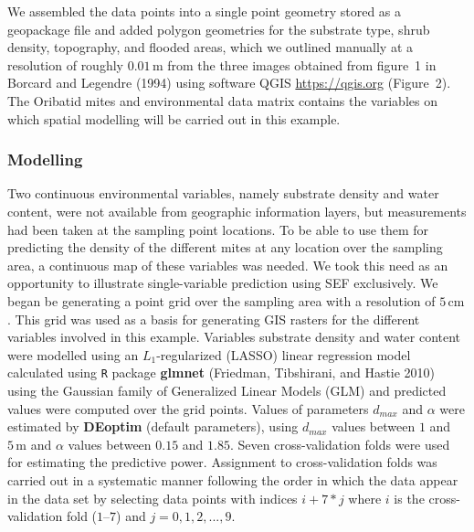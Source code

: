 \documentclass[
]{article}
\begin{document}
We assembled the data points into a single point geometry stored as a
geopackage file and added polygon geometries for the substrate type,
shrub density, topography, and flooded areas, which we outlined manually
at a resolution of roughly \(0.01\,\mathrm{m}\) from the three images
obtained from figure~1 in Borcard and Legendre (1994) using software
QGIS \url{https://qgis.org} (Figure~2). The Oribatid mites and
environmental data matrix contains the variables on which spatial
modelling will be carried out in this example.

\subsubsection{Modelling}\label{modelling}

Two continuous environmental variables, namely substrate density and
water content, were not available from geographic information layers,
but measurements had been taken at the sampling point locations. To be
able to use them for predicting the density of the different mites at
any location over the sampling area, a continuous map of these variables
was needed. We took this need as an opportunity to illustrate
single-variable prediction using SEF exclusively. We began be generating
a point grid over the sampling area with a resolution of
\(5\,\mathrm{cm}\). This grid was used as a basis for generating GIS
rasters for the different variables involved in this example. Variables
substrate density and water content were modelled using an
\(L_1\)-regularized (LASSO) linear regression model calculated using
\texttt{R} package \textbf{glmnet} (Friedman, Tibshirani, and Hastie
2010) using the Gaussian family of Generalized Linear Models (GLM) and
predicted values were computed over the grid points. Values of
parameters \(d_{max}\) and \(\alpha\) were estimated by \textbf{DEoptim}
(default parameters), using \(d_{max}\) values between \(1\) and
\(5\,\mathrm{m}\) and \(\alpha\) values between \(0.15\) and \(1.85\).
Seven cross-validation folds were used for estimating the predictive
power. Assignment to cross-validation folds was carried out in a
systematic manner following the order in which the data appear in the
data set by selecting data points with indices \(i + 7*j\) where \(i\)
is the cross-validation fold (\(1\)--\(7\)) and \(j = 0, 1, 2, ..., 9\).
\end{document}
